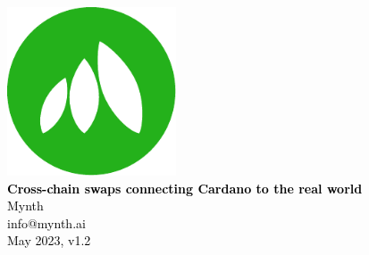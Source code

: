 \documentclass{article}
\begin{document}
\begin{sloppypar}

\begin{titlepage}
\sffamily\selectfont
\centering
\vspace*{7cm}
{\includegraphics[width=5cm]{
mynth-logo.pdf}}\\[5\baselineskip]
\textcolor{black}{
{\Large \textbf{Cross-chain swaps connecting Cardano to the real world}}\\[2\baselineskip]
{\Large Mynth}\\[0.5\baselineskip]
{\large info@mynth.ai}\\[3\baselineskip]
{\large May 2023, v1.2}
}
\end{titlepage}

\tableofcontents



\end{sloppypar}
\end{document}
